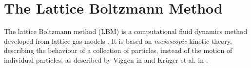 \documentclass[a4paper, 11pt]{report}
\begin{document}
\chapter{The Lattice Boltzmann Method} \label{chap:3}
The lattice Boltzmann method (LBM) is a computational fluid dynamics method developed from lattice gas models \cite[Chapter~2]{lbtextbook}. It is based on \emph{mesoscopic} kinetic theory, describing the behaviour of a collection of particles, instead of the motion of individual particles, as described by Viggen in \cite[Chapter~1]{lbfund} and Kr{\"u}ger et al. in \cite[Section~1.3]{lbtextbook}. %






\end{document}
